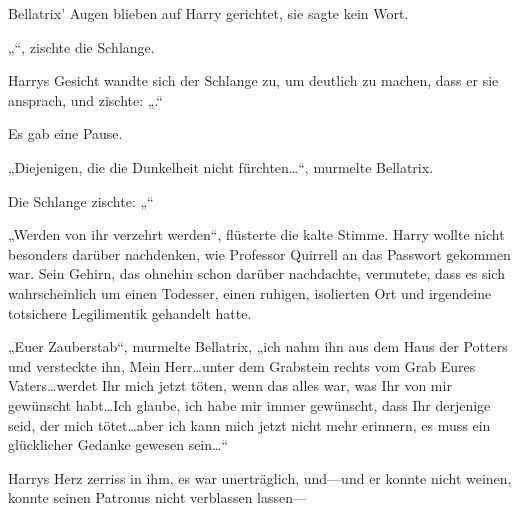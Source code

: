 Bellatrix’ Augen blieben auf Harry gerichtet, sie sagte kein Wort.

„“, zischte die Schlange.

Harrys Gesicht wandte sich der Schlange zu, um deutlich zu machen, dass er sie ansprach, und zischte: „.“

Es gab eine Pause.

„Diejenigen, die die Dunkelheit nicht fürchten…“, murmelte Bellatrix.

Die Schlange zischte: „“

„Werden von ihr verzehrt werden“, flüsterte die kalte Stimme. Harry wollte nicht besonders darüber nachdenken, wie Professor Quirrell an das Passwort gekommen war. Sein Gehirn, das ohnehin schon darüber nachdachte, vermutete, dass es sich wahrscheinlich um einen Todesser, einen ruhigen, isolierten Ort und irgendeine totsichere Legilimentik gehandelt hatte.

„Euer Zauberstab“, murmelte Bellatrix, „ich nahm ihn aus dem Haus der Potters und versteckte ihn, Mein Herr…unter dem Grabstein rechts vom Grab Eures Vaters…werdet Ihr mich jetzt töten, wenn das alles war, was Ihr von mir gewünscht habt…Ich glaube, ich habe mir immer gewünscht, dass Ihr derjenige seid, der mich tötet…aber ich kann mich jetzt nicht mehr erinnern, es muss ein glücklicher Gedanke gewesen sein…“

Harrys Herz zerriss in ihm, es war unerträglich, und—und er konnte nicht weinen, konnte seinen Patronus nicht verblassen lassen—

